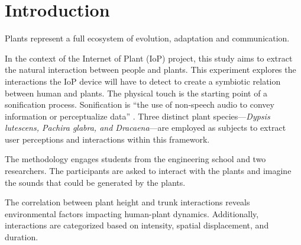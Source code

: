 \section{Introduction}


Plants represent a full ecosystem of evolution, adaptation and communication.

In the context of the Internet of Plant (IoP) project, this study aims to extract the natural interaction between people and plants.
This experiment explores the interactions the IoP device will have to detect to create a symbiotic relation between human and plants. 
The physical touch is the starting point of a sonification process.
Sonification is “the use of non-speech audio to convey information or perceptualize data” \cite{kramer2010sonification}.
Three distinct plant species—\textit{Dypsis lutescens, Pachira glabra, and Dracaena}—are employed as subjects to extract user perceptions and interactions within this framework. 


The methodology engages students from the engineering school and two researchers.
The participants are asked to interact with the plants and imagine the sounds that could be generated by the plants.

The correlation between plant height and trunk interactions reveals environmental factors impacting human-plant dynamics.
Additionally, interactions are categorized based on intensity, spatial displacement, and duration.

